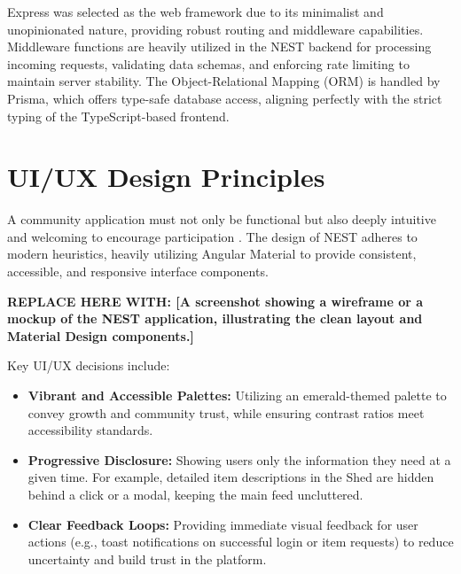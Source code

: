 Express was selected as the web framework due to its minimalist and unopinionated nature, providing robust routing and middleware capabilities. Middleware functions are heavily utilized in the NEST backend for processing incoming requests, validating data schemas, and enforcing rate limiting to maintain server stability. The Object-Relational Mapping (ORM) is handled by Prisma, which offers type-safe database access, aligning perfectly with the strict typing of the TypeScript-based frontend.

\section{UI/UX Design Principles}
A community application must not only be functional but also deeply intuitive and welcoming to encourage participation \cite{norman1986cognitive}. The design of NEST adheres to modern heuristics, heavily utilizing Angular Material to provide consistent, accessible, and responsive interface components.

\textbf{REPLACE HERE WITH: [A screenshot showing a wireframe or a mockup of the NEST application, illustrating the clean layout and Material Design components.]}

Key UI/UX decisions include:
\begin{itemize}
    \item \textbf{Vibrant and Accessible Palettes:} Utilizing an emerald-themed palette to convey growth and community trust, while ensuring contrast ratios meet accessibility standards.
    \item \textbf{Progressive Disclosure:} Showing users only the information they need at a given time. For example, detailed item descriptions in the Shed are hidden behind a click or a modal, keeping the main feed uncluttered.
    \item \textbf{Clear Feedback Loops:} Providing immediate visual feedback for user actions (e.g., toast notifications on successful login or item requests) to reduce uncertainty and build trust in the platform.
\end{itemize}
